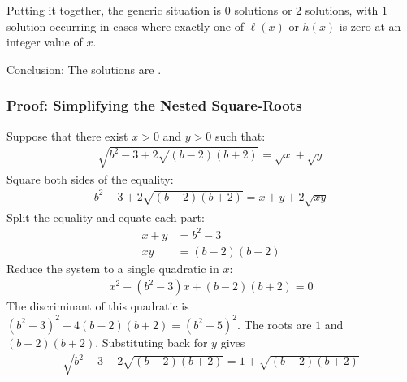 Putting it together, the generic situation is $0$ solutions or $2$ solutions, with $1$ solution occurring in cases where exactly one of $\ell(x)$ or $h(x)$ is zero at an integer value of $x$.

Conclusion: The solutions are .


\subsubsection*{Proof: Simplifying the Nested Square-Roots}
Suppose that there exist $x>0$ and $y>0$ such that:
\begin{align*}
\sqrt{b^{2}-3+2\sqrt{(b-2)(b+2)}}
= \sqrt{x} + \sqrt{y}
\end{align*}
Square both sides of the equality:
\begin{align*}
b^{2}-3+2\sqrt{(b-2)(b+2)}
= x + y + 2\sqrt{xy}
\end{align*}
Split the equality and equate each part:
\begin{align*}
x + y & = b^{2}-3
\\
x y & = (b-2)(b+2)
\end{align*}
Reduce the system to a single quadratic in $x$:
\begin{align*}
x^{2} - (b^{2}-3) x + (b-2)(b+2) = 0
\end{align*}
The discriminant of this quadratic is ${(b^{2}-3)^{2}-4(b-2)(b+2)=(b^{2}-5)^{2}}$. The roots are $1$ and $(b-2)(b+2)$. Substituting back for $y$ gives
\begin{align*}
\sqrt{b^{2}-3+2\sqrt{(b-2)(b+2)}}
= 1 + \sqrt{(b-2)(b+2)}
\end{align*}
